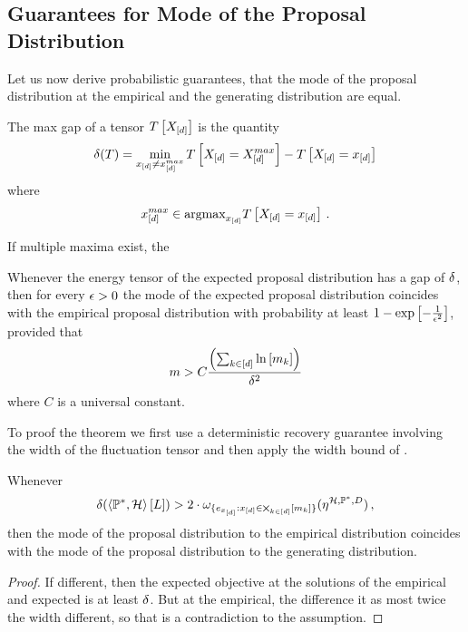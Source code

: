 \subsection{Guarantees for Mode of the Proposal Distribution}

Let us now derive probabilistic guarantees, that the mode of the proposal distribution at the empirical and the generating distribution are equal.

\begin{definition}
	The max gap of a tensor $T\left[X_{[d]}\right]$ is the quantity
		\[ \delta(T) 
		= \min_{x_{[d]} \neq x_{[d]}^{max}} T\left[X_{[d]} = X_{[d]}^{max}\right] - T\left[X_{[d]}=x_{[d]}\right] \]
	where
		\[ x_{[d]}^{max} \in \mathrm{argmax}_{x_{[d]}} T\left[X_{[d]}=x_{[d]}\right] \, . \]
\end{definition}

If multiple maxima exist, the



\begin{theorem}\label{the:probGuaranteeProposalDist}
	Whenever the energy tensor of the expected proposal distribution has a gap of $\delta$, then for every $\epsilon>0$ the mode of the expected proposal distribution coincides with the empirical proposal distribution with probability at least $1-\mathrm{exp}\left[-\frac{1}{\epsilon^2}\right]$, provided that
		\[ m > C\frac{\left(\sum_{k\in[d]}\ln \left[ m_{k} \right]\right)}{\delta^2} \]
	where $C$ is a universal constant.
\end{theorem}

To proof the theorem we first use a deterministic recovery guarantee involving the width of the fluctuation tensor and then apply the width bound of .

\begin{lemma}\label{lem:detGuaranteeProposalDist}
	Whenever 
	\begin{align*}
		\delta(\left\langle \mathbb{P}^*,\mathcal{H}\right\rangle \left[ L \right]) 
		> 2 \cdot  \omega_{\{e_{x_{[d]}} :x_{[d]}\in\bigtimes_{k\in[d]}[m_{k}]\}}(\eta^{\mathcal{H},\mathbb{P}^*,D}) \, , 
	\end{align*}
	then the mode of the proposal distribution to the empirical distribution coincides with the mode of the proposal distribution to the generating distribution.
\end{lemma}
\begin{proof}
	If different, then the expected objective at the solutions of the empirical and expected is at least $\delta$.
	But at the empirical, the difference it as most twice the width different, so that is a contradiction to the assumption.
\end{proof}



